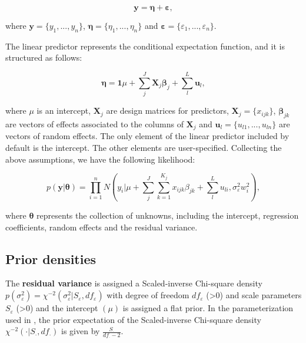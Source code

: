 \documentclass[article,shortnames,nojss]{jss}
\begin{document}
\begin{equation*}
  \boldsymbol{y}=\boldsymbol{\eta} + \boldsymbol{\varepsilon},
\end{equation*}

where $\boldsymbol y=\{y_1,...,y_n\}$,  $\boldsymbol \eta=\{\eta_1,...,\eta_n\}$ and 
$\boldsymbol \varepsilon=\{\varepsilon_1,...,\varepsilon_n\}$.

The linear predictor represents the conditional 
expectation function, and it is structured as follows:

\begin{equation}
  \label{eq:eta}
  \boldsymbol{\eta}=\boldsymbol 1 \mu + %
  \sum_{j}^J \boldsymbol{X}_j \boldsymbol{\beta}_j + %
  \sum_{l}^{L} \boldsymbol u_l,
\end{equation}

where $\mu$ is an intercept, $\boldsymbol X_j$ are design matrices for predictors, 
$\boldsymbol X_j=\{x_{ijk}\}$, $\boldsymbol \beta_{jk}$ are vectors of 
effects associated to the columns of $\boldsymbol X_j$ and 
$\boldsymbol u_l=\{u_{l1},...,u_{ln}\}$ are vectors of random effects. 
The only element of the linear predictor included by default is the intercept. The 
other elements are user-specified. Collecting the above assumptions, 
we have the following likelihood:

\begin{equation*}
  p(\boldsymbol y | \boldsymbol \theta)= %
  \prod_{i=1}^n N(y_i | \mu + \sum_j^J \sum_{k=1}^{K_j} x_{ijk} \beta_{jk} + \sum_l^L u_{li}, %
                  \sigma_\varepsilon^2 w_i^2),
\end{equation*}

where $\boldsymbol \theta$ represents the collection of 
unknowns, including the intercept, regression 
coefficients, random effects and the residual variance.

\subsection{Prior densities}

The \textbf{residual variance} is assigned a Scaled-inverse Chi-square 
density $p(\sigma_\varepsilon^2)=\chi^{-2}(\sigma_\varepsilon^2 | S_\varepsilon, df_\varepsilon)$
with degree of freedom $df_\varepsilon$ (>0) 
and scale parameters $S_\varepsilon$ (>0) and the intercept $(\mu)$ is assigned a flat prior. 
In the parameterization used in , the prior expectation of the Scaled-inverse Chi-square 
density $\chi^{-2}(\cdot| S_{\cdot}, df_{\cdot})$ is given by  
$\frac{S_\cdot}{df_\cdot-2}$.
\end{document}
